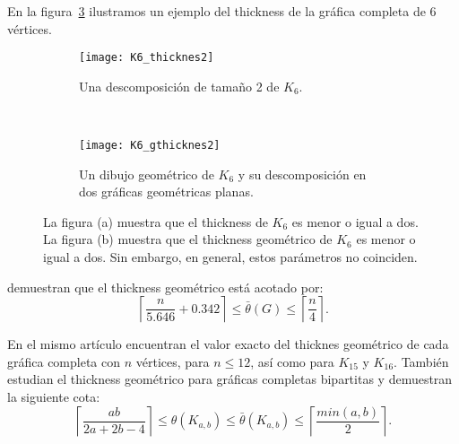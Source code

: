 En la figura~\ref{fig:thicknessexample} ilustramos un ejemplo del thickness de
la gráfica completa de 6 vértices.
\begin{figure}[htb]
  \centering
\begin{subfigure}[h]{.5\textwidth}
  \centering
  \texttt{[image: K6\_thicknes2]}
  \caption{Una descomposición de tamaño 2 de $K_6$.}
  \label{fig:thk6}
\end{subfigure}%
\\
\begin{subfigure}[h]{.5\textwidth}
  \centering
  \texttt{[image: K6\_gthicknes2]}
  \caption{Un dibujo geométrico de $K_6$ y su descomposición
  en dos gráficas geométricas planas.}
  \label{fig:gthk6}
\end{subfigure}
\caption{La figura (a) muestra que el thickness de $K_6$ es menor o igual a dos. La figura (b) muestra que el thickness geométrico de $K_6$ es menor o igual a dos. Sin embargo, en general, estos parámetros no coinciden.}
\label{fig:thicknessexample}
\end{figure}




\cite{Dillencourt2004} demuestran que el thickness geométrico está acotado por:
\[ \left\lceil \frac{n}{5.646} + 0.342 \right\rceil \leq  \bar{\theta}(G) \leq \left\lceil\frac{n}{4}\right\rceil .\]

En el mismo artículo encuentran el valor exacto del thicknes geométrico
de cada gráfica completa con $n$ vértices, para $n\leq 12$, así como para $K_{15}$ y $K_{16}$.
También estudian el thickness geométrico para gráficas completas bipartitas y demuestran la
siguiente cota:
\[
  \left\lceil \frac{ab}{2a+2b-4} \right\rceil \leq \theta(K_{a,b}) \leq \bar{\theta}(K_{a,b})
  \leq \left\lceil \frac{min(a,b)}{2} \right\rceil.
\]

